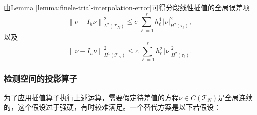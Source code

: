 由Lemma \ref{lemma:finele-trial-interpolation-error}可得分段线性插值的全局误差项
\begin{equation}
  \label{eq:finele-trial-interpolation-error-global-L}
  \left\|
  \nu - I_{h} \nu
  \right\|_{L^{2}(\mathcal{T}_{N})}^{2}
  \le c \, \sum_{\ell=1}^{\ell} h_{\ell}^{4} \, \left| \nu \right|_{H^{2}(\tau_{\ell})}^{2},
\end{equation}
以及
\begin{equation}
  \label{eq:finele-trial-interpolation-error-global-H}
  \left\|
  \nu - I_{h} \nu
  \right\|_{H^{1}(\mathcal{T}_{N})}^{2}
  \le c \, \sum_{\ell=1}^{\ell} h_{\ell}^{2} \, \left| \nu \right|_{H^{2}(\tau_{\ell})}^{2}.
\end{equation}

\subsubsection{检测空间的投影算子}
\label{sec:finele-trial-projection}
为了应用插值算子执行上述运算，需要假定待差值的方程$\nu \in C \left( \mathcal{T}_{N} \right)$是全局连续的，这个假设过于强硬，有时较难满足。一个替代方案是以下若假设：
